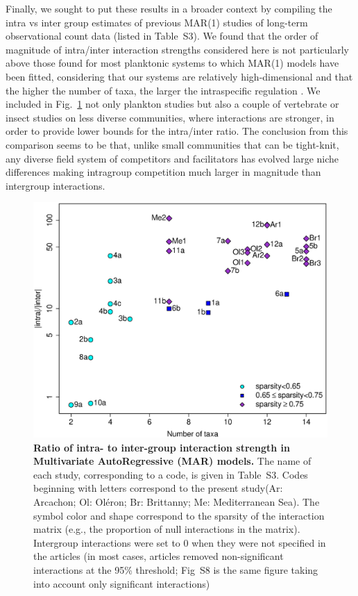 \documentclass[10pt]{article}
\begin{document}
Finally, we sought to put these results in a broader context by compiling
the intra vs inter group estimates of previous MAR(1) studies of long-term
observational count data (listed in Table~S3). We found that the
order of magnitude of intra/inter interaction strengths considered
here is not particularly above those found for most planktonic systems
to which MAR(1) models have been fitted, considering that our systems
are relatively high-dimensional and that the higher the number of
taxa, the larger the intraspecific regulation \citep{barabas_self-regulation_2017}.
We included in Fig.~\ref{fig:meta_ratio} not only plankton studies
but also a couple of vertebrate or insect studies on less diverse
communities, where interactions are stronger, in order to provide lower bounds for the intra/inter ratio. The conclusion from
this comparison seems to be that, unlike small communities that can
be tight-knit, any diverse field system of competitors and facilitators
has evolved large niche differences making intragroup competition
much larger in magnitude than intergroup interactions.

\begin{figure}[!h]
\centering \includegraphics[width=0.8\linewidth]{Ratio_function_dim}
\caption{\textbf{Ratio of intra- to inter-group interaction strength in Multivariate
AutoRegressive (MAR) models.} The name of each study,
corresponding to a code, is given in Table~S3. Codes beginning
with letters correspond to the present study(Ar: Arcachon; Ol: Oléron; Br: Brittanny; Me: Mediterranean Sea). The symbol color and
shape correspond to the sparsity of the interaction matrix (e.g.,
the proportion of null interactions in the matrix). Intergroup interactions
were set to 0 when they were not specified in the articles (in most
cases, articles removed non-significant interactions at the 95\% threshold;
Fig~S8 is the same figure taking into account only significant interactions)}
\label{fig:meta_ratio} 
\end{figure}
\end{document}
